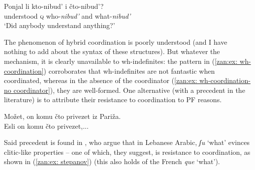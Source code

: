 \documentclass[output=paper,colorlinks,citecolor=brown]{langscibook}
\begin{document}
      \ex
        \gll Ponjal li kto-nibud' i čto-nibud'?\\
        understood \textsc{q} who-\textit{nibud'} and what-\textit{nibud'}\\
        \glt `Did anybody understand anything?'
\z
\z

\z

\noindent The phenomenon of hybrid coordination is poorly understood (and I have nothing to add about the syntax of these structures). But whatever the mechanism, it is clearly unavailable to wh-indefinites: the pattern in (\ref{zan:ex: wh-coordination}) corroborates that wh-indefinites are not fantastic when coordinated, whereas in the absence of the coordinator (\ref{zan:ex: wh-coordination-no coordinator}), they are well-formed. One alternative (with a precedent in the literature) is to attribute their resistance to coordination to PF reasons.  

\ea \label{zan:ex: wh-coordination}
\z
\z

\ea \label{zan:ex: wh-coordination-no coordinator}
\ea Možet, on komu čto privezet iz Pariža.\\
\ex Esli on komu čto privezet,... \\
\z
\z

\noindent Said precedent is found in \citet{StepanovArthur2020WaWW}, who argue that in Lebanese Arabic, \textit{ʃu} `what' evinces clitic-like properties -- one of which, they suggest, is resistance to coordination, as shown in (\ref{zan:ex: stepanov}) (this also holds of the French \textit{que} `what'). 

\ea \label{zan:ex: stepanov}
\end{document}

